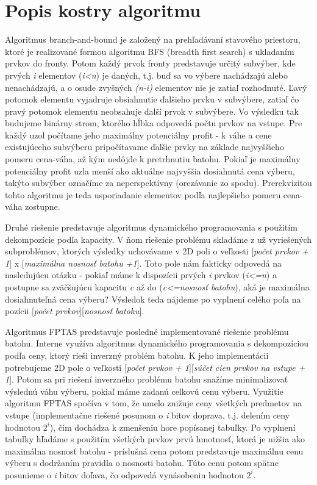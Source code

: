 \documentclass[slovak]{article}
\begin{document}
\section{Popis kostry algoritmu}

Algoritmus branch-and-bound je založený na prehľadávaní stavového priestoru, ktoré je realizované formou algoritmu BFS (breadth first search) s ukladaním prvkov do fronty. Potom každý prvok fronty predstavuje určitý subvýber, kde prvých \emph{i} elementov (\emph{i<n}) je daných, t.j. buď sa vo výbere nachádzajú alebo nenachádzajú, a o osude zvyšných \emph{(n-i)} elementov nie je zatiaľ rozhodnuté. Ľavý potomok elementu vyjadruje obsiahnutie ďalšieho prvku v subvýbere, zatiaľ čo pravý potomok elementu neobsahuje ďalší prvok v subvýbere. Vo výsledku tak budujeme binárny strom, ktorého hĺbka odpovedá počtu prvkov na vstupe. Pre každý uzol počítame jeho maximálny potenciálny profit - k váhe a cene existujúceho subvýberu pripočítavame ďalšie prvky na základe najvyššieho pomeru cena-váha, až kým nedôjde k pretrhnutiu batohu. Pokiaľ je maximálny potenciálny profit uzla menší ako aktuálne najvyššia dosiahnutá cena výberu, takýto subvýber označíme za neperspektívny (orezávanie zo spodu). Prerekvizitou tohto algoritmu je teda usporiadanie elementov podľa najlepšieho pomeru cena-váha zostupne.

Druhé riešenie predstavuje algoritmus dynamického programovania s použitím dekompozície podľa kapacity. V ňom riešenie problému skladáme z už vyriešených subproblémov, ktorých výsledky uchovávame v 2D poli o veľkosti [\emph{počet prvkov + 1}] x [\emph{maximálna nosnosť batohu +1}]. Toto pole nám fakticky odpovedá na nasledujúcu otázku - pokiaľ máme k dispozícii prvých \emph{i} prvkov (\emph{i<=n}) a postupne sa zväčšujúcu kapacitu \emph{c} až do (\emph{c<=nosnosť batohu}), aká je maximálna dosiahnuteľná cena výberu? Výsledok teda nájdeme po vyplnení celého poľa na pozícii [\emph{počet prvkov}][\emph{nosnosť batohu}].

Algoritmus FPTAS predstavuje posledné implementované riešenie problému batohu. Interne využíva algoritmus dynamického programovania s dekompozíciou podľa ceny, ktorý rieši inverzný problém batohu. K jeho implementácii potrebujeme 2D pole o veľkosti [\emph{počet prvkov + 1}][\emph{súčet cien prvkov na vstupe + 1}]. Potom sa pri riešení inverzného problému batohu snažíme minimalizovať výslednú váhu výberu, pokiaľ máme zadanú celkovú cenu výberu. Využitie algoritmu FPTAS spočíva v tom, že umelo znižuje ceny všetkých predmetov na vstupe (implementačne riešené posunom o \emph{i} bitov doprava, t.j. delením ceny hodnotou $2^i$), čím dochádza k zmenšeniu hore popísanej tabuľky. Po vyplnení tabuľky hľadáme s použitím všetkých prvkov prvú hmotnosť, ktorá je nižšia ako maximálna nosnosť batohu - príslušná cena potom predstavuje maximálnu cenu výberu s dodržaním pravidla o nosnosti batohu. Túto cenu potom spätne posunieme o \emph{i} bitov doľava, čo odpovedá vynásobeniu hodnotou $2^i$.
\end{document}
